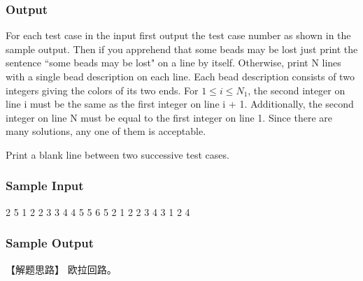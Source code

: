 \subsubsection{Output}
For each test case in the input first output the test case number as shown in the sample output. Then
if you apprehend that some beads may be lost just print the sentence ``some beads may be lost" on a
line by itself. Otherwise, print N lines with a single bead description on each line. Each bead
description consists of two integers giving the colors of its two ends. For $1 \leq i \leq N_1$, the second integer
on line i must be the same as the first integer on line i + 1. Additionally, the second integer
on line N must be equal to the first integer on line 1. Since there are many solutions, any one
 of them is acceptable.

Print a blank line between two successive test cases.

\subsubsection{Sample Input}
\begin{Code}
    2
    5
    1 2
    2 3
    3 4
    4 5
    5 6
    5
    2 1
    2 2
    3 4
    3 1
    2 4
\end{Code}

\subsubsection{Sample Output}

【解题思路】
欧拉回路。

